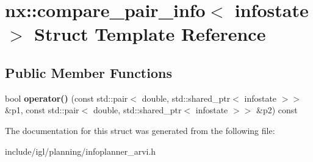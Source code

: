 \hypertarget{structnx_1_1compare__pair__info}{}\section{nx\+:\+:compare\+\_\+pair\+\_\+info$<$ infostate $>$ Struct Template Reference}
\label{structnx_1_1compare__pair__info}
\subsection*{Public Member Functions}
\begin{DoxyCompactItemize}
\item 
\mbox{\label{structnx_1_1compare__pair__info_aa7ce05b866a5ee5b9045b9a141299a14}} 
bool {\bfseries operator()} (const std\+::pair$<$ double, std\+::shared\+\_\+ptr$<$ infostate $>$$>$ \&p1, const std\+::pair$<$ double, std\+::shared\+\_\+ptr$<$ infostate $>$$>$ \&p2) const
\end{DoxyCompactItemize}


The documentation for this struct was generated from the following file\+:\begin{DoxyCompactItemize}
\item 
include/igl/planning/infoplanner\+\_\+arvi.\+h\end{DoxyCompactItemize}
